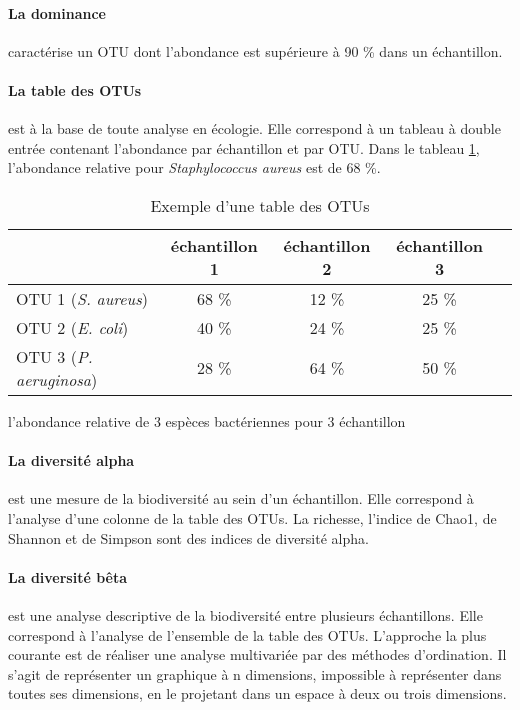 \documentclass[12pt,a4paper]{article}
\begin{document}
\paragraph{La dominance} caractérise un OTU dont l'abondance est supérieure à 90 \% dans un échantillon.


\paragraph{La table des OTUs} est à la base de toute analyse en écologie. Elle correspond à un tableau à double entrée contenant l’abondance par échantillon et par OTU. Dans le tableau \ref{OTUTABLE}, l'abondance relative pour \textit{Staphylococcus aureus} est de 68 \%.

\begin{table}[h]
\begin{center}
\begin{tabular}{|l|c|c|c|c}
  \hline
   & échantillon 1 & échantillon 2 & échantillon 3  \\
  \hline
  OTU 1 (\textit{S. aureus}) & 68 \% & 12 \% & 25 \% \\
  OTU 2 (\textit{E. coli})& 40 \% & 24 \% & 25 \% \\
  OTU 3 (\textit{P. aeruginosa}) & 28 \% & 64 \% & 50 \% \\

  \hline
\end{tabular}
\end{center}
\caption{Exemple d'une table des OTUs}
\centering
l'abondance relative de 3 espèces bactériennes pour 3 échantillon
\label{OTUTABLE}
\end{table}

\paragraph{La diversité alpha} est une mesure de la biodiversité au sein d’un échantillon. Elle correspond à l'analyse d'une colonne de la table des OTUs. La richesse, l'indice de Chao1, de Shannon et de Simpson sont des indices de diversité alpha.

\paragraph{La diversité bêta} est une analyse descriptive de la biodiversité entre plusieurs échantillons. Elle correspond à l'analyse de l’ensemble de la table des OTUs. L’approche la plus courante est de réaliser une analyse multivariée par des méthodes d’ordination. Il s’agit de représenter un graphique à n dimensions, impossible à représenter dans toutes ses dimensions, en le projetant dans un espace à deux ou trois dimensions.
\end{document}
